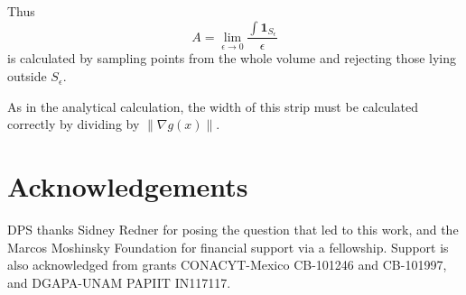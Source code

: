 \documentclass[superscriptaddress,pre,reprint,showpacs,twocolumn]{revtex4-1}
\begin{document}
Thus 
$$A = \lim_{\epsilon \to 0} \frac{ \int \mathbf{1}_{S_\epsilon}}{\epsilon}$$ 
is calculated by sampling points from the whole volume and rejecting those lying outside $S_\epsilon$.
 
As in the analytical calculation, the width of this strip must be calculated correctly by dividing by $\| \nabla g(x) \|$.

    
\section*{Acknowledgements}


DPS thanks Sidney Redner for posing the question that led to this work, and the Marcos Moshinsky Foundation for financial support via a fellowship.
Support is also acknowledged from grants CONACYT-Mexico CB-101246 and CB-101997, and DGAPA-UNAM PAPIIT IN117117.



\end{document}

